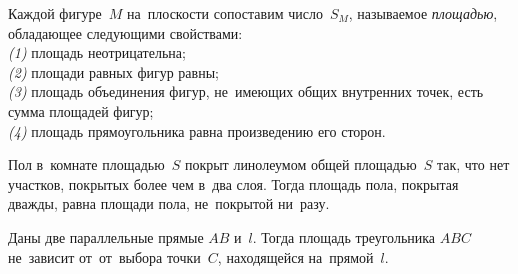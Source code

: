 


Каждой фигуре~$M$ на~плоскости сопоставим число~$S_{M}$, называемое
\emph{площадью}, обладающее следующими свойствами:
\\
\emph{(1)}\enspace
площадь неотрицательна;
\\
\emph{(2)}\enspace
площади равных фигур равны;
\\
\emph{(3)}\enspace
площадь объединения фигур, не~имеющих общих внутренних точек, есть сумма
площадей фигур;
\\
\emph{(4)}\enspace
площадь прямоугольника равна произведению его сторон.

Пол в~комнате площадью~$S$ покрыт линолеумом общей площадью~$S$ так, что нет
участков, покрытых более чем в~два слоя.
Тогда площадь пола, покрытая дважды, равна площади пола, не~покрытой ни~разу.

Даны две параллельные прямые $AB$ и~$l$.
Тогда площадь треугольника $ABC$ не~зависит от~от~выбора точки~$C$, находящейся
на~прямой~$l$.

